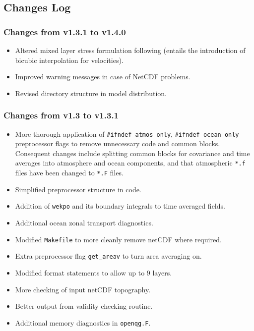 \documentclass[11pt, a4paper,twoside]{article}
\numberwithin{equation}{section}
\begin{document}
\subsection{Changes Log}
\subsubsection{Changes from v1.3.1 to v1.4.0}
\begin{itemize}
\item Altered mixed layer stress formulation following \cite{duhaut:06} (entails the introduction of bicubic interpolation for velocities).
\item Improved warning messages in case of NetCDF problems.
\item Revised directory structure in model distribution.
\end{itemize}

\subsubsection{Changes from v1.3 to v1.3.1}
\begin{itemize}
  \item More thorough application of \verb=#ifndef atmos_only=, \verb=#ifndef ocean_only= preprocessor flags to remove unnecessary code and common blocks.   Consequent changes include splitting common blocks for covariance and time averages into atmosphere and ocean components, and that atmospheric \verb=*.f= files have been changed to \verb=*.F= files.
\item Simplified preprocessor structure in code.
\item Addition of \verb=wekpo= and its boundary integrals to time averaged fields.
\item Additional ocean zonal transport diagnostics.
\item Modified \verb=Makefile= to more cleanly remove netCDF where required.
\item Extra preprocessor flag \verb=get_areav= to turn area averaging on.
\item Modified format statements to allow up to 9 layers.
\item More checking of input netCDF topography.
\item Better output from validity checking routine.
\item Additional memory diagnostics in \verb=openqg.F=.
\end{itemize}
  
\end{document}
